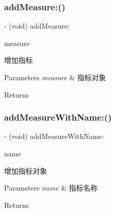 \subsubsection{\texorpdfstring{add\+Measure\+:()}{addMeasure:()}}
{\footnotesize\ttfamily -\/ (void) add\+Measure\+: \begin{DoxyParamCaption}\item[{(\mbox{\hyperlink{interface_app_monitor_measure}{App\+Monitor\+Measure}} $\ast$)}]{measure }\end{DoxyParamCaption}}

增加指标


\begin{DoxyParams}{Parameters}
{\em measure} & 指标对象 \\
\hline
\end{DoxyParams}
\begin{DoxyReturn}{Returns}

\end{DoxyReturn}
\mbox{\label{interface_app_monitor_measure_set_abca2f2157a4a76f42617bc9b043b6b06}} 
\subsubsection{\texorpdfstring{add\+Measure\+With\+Name\+:()}{addMeasureWithName:()}}
{\footnotesize\ttfamily -\/ (void) add\+Measure\+With\+Name\+: \begin{DoxyParamCaption}\item[{(N\+S\+String $\ast$)}]{name }\end{DoxyParamCaption}}

增加指标对象


\begin{DoxyParams}{Parameters}
{\em name} & 指标名称 \\
\hline
\end{DoxyParams}
\begin{DoxyReturn}{Returns}

\end{DoxyReturn}
\mbox{\label{interface_app_monitor_measure_set_a000f95b993f767c95c15fab2d878c868}} 
